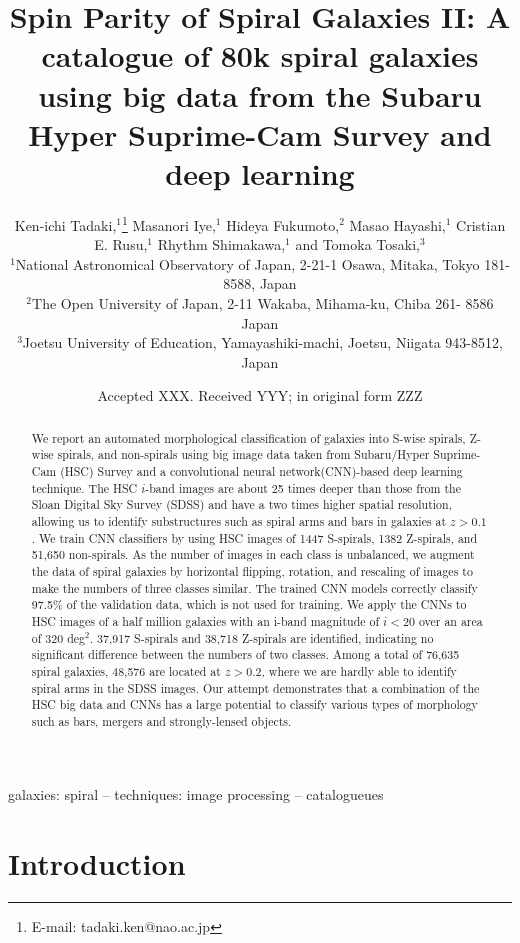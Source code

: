 \documentclass[a4paper,fleqn,usenatbib]{mnras}
\title[Spin Parity of Spiral Galaxies II]{Spin Parity of Spiral Galaxies II: A catalogue of 80k spiral galaxies using big data from the Subaru Hyper Suprime-Cam Survey and deep learning}
\author[K. Tadaki et al.]{
Ken-ichi Tadaki,$^{1}$\thanks{E-mail: tadaki.ken@nao.ac.jp}
Masanori Iye,$^{1}$
Hideya Fukumoto,$^{2}$
Masao Hayashi,$^{1}$
\newauthor
Cristian E. Rusu,$^{1}$
Rhythm Shimakawa,$^{1}$
and Tomoka Tosaki,$^{3}$\\
$^{1}$National Astronomical Observatory of Japan, 2-21-1 Osawa, Mitaka, Tokyo 181-8588, Japan\\
$^{2}$The Open University of Japan, 2-11 Wakaba, Mihama-ku, Chiba 261- 8586 Japan\\
$^{3}$Joetsu University of Education, Yamayashiki-machi, Joetsu, Niigata 943-8512, Japan\\
}
\date{Accepted XXX. Received YYY; in original form ZZZ}
\begin{document}
\label{firstpage}
\pagerange{\pageref{firstpage}--\pageref{lastpage}}
\maketitle

\begin{abstract}
We report an automated morphological classification of galaxies into S-wise spirals, Z-wise spirals, and non-spirals using big image data taken from Subaru/Hyper Suprime-Cam (HSC) Survey and a convolutional neural network(CNN)-based deep learning technique.
The HSC $i$-band images are about 25 times deeper than those from the Sloan Digital Sky Survey (SDSS) and have a two times higher spatial resolution, allowing us to identify substructures such as spiral arms and bars in galaxies at $z>0.1$.
We train CNN classifiers by using HSC images of 1447 S-spirals, 1382 Z-spirals, and 51,650 non-spirals. 
As the number of images in each class is unbalanced, we augment the data of spiral galaxies by horizontal flipping, rotation, and rescaling of images to make the numbers of three classes similar.
The trained CNN models correctly classify 97.5\% of the validation data, which is not used for training.
We apply the CNNs to HSC images of a half million galaxies with an i-band magnitude of $i<20$ over an area of 320 deg$^2$.
37,917 S-spirals and 38,718 Z-spirals are identified, indicating no significant difference between the numbers of two classes.
Among a total of 76,635 spiral galaxies, 48,576 are located at $z>0.2$, where we are hardly able to identify spiral arms in the SDSS images. 
Our attempt demonstrates that a combination of the HSC big data and CNNs has a large potential to classify various types of morphology such as bars, mergers and strongly-lensed objects.
\end{abstract}

\begin{keywords}
galaxies: spiral -- techniques: image processing -- catalogueues
\end{keywords}



\section{Introduction}
\end{document}
